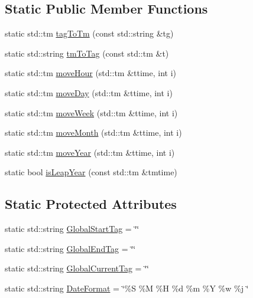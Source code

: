 \subsection*{\-Static \-Public \-Member \-Functions}
\begin{DoxyCompactItemize}
\item 
static std\-::tm \hyperlink{classcryomesh_1_1state_1_1PatternTagByDate_a783b2953283a8478f6919fd304cb69f1}{tag\-To\-Tm} (const std\-::string \&tg)
\item 
static std\-::string \hyperlink{classcryomesh_1_1state_1_1PatternTagByDate_a8c7d0a7aa8bf92aa05c2ea8ae2c60700}{tm\-To\-Tag} (const std\-::tm \&t)
\item 
static std\-::tm \hyperlink{classcryomesh_1_1state_1_1PatternTagByDate_ae0e700b6ce6d8b84e97e8b3e551fde57}{move\-Hour} (std\-::tm \&ttime, int i)
\item 
static std\-::tm \hyperlink{classcryomesh_1_1state_1_1PatternTagByDate_a9911819de318f1d49f04c67110dd95cd}{move\-Day} (std\-::tm \&ttime, int i)
\item 
static std\-::tm \hyperlink{classcryomesh_1_1state_1_1PatternTagByDate_a589ad778ee7350673d25c553bda0eb83}{move\-Week} (std\-::tm \&ttime, int i)
\item 
static std\-::tm \hyperlink{classcryomesh_1_1state_1_1PatternTagByDate_a04a41144a760e5a85c0aa4d7b05fdb30}{move\-Month} (std\-::tm \&ttime, int i)
\item 
static std\-::tm \hyperlink{classcryomesh_1_1state_1_1PatternTagByDate_ab47ab805764e76faff1791594fa83770}{move\-Year} (std\-::tm \&ttime, int i)
\item 
static bool \hyperlink{classcryomesh_1_1state_1_1PatternTagByDate_a20516b67d8c03a508c0b30395fd2784a}{is\-Leap\-Year} (const std\-::tm \&tmtime)
\end{DoxyCompactItemize}
\subsection*{\-Static \-Protected \-Attributes}
\begin{DoxyCompactItemize}
\item 
static std\-::string \hyperlink{classcryomesh_1_1state_1_1PatternTagByDate_add7aad1fe2fa9ba68a1f6efba392164b}{\-Global\-Start\-Tag} = \char`\"{}\char`\"{}
\item 
static std\-::string \hyperlink{classcryomesh_1_1state_1_1PatternTagByDate_a3e16a76aea6ea2d84e8f90fb9a861a3d}{\-Global\-End\-Tag} = \char`\"{}\char`\"{}
\item 
static std\-::string \hyperlink{classcryomesh_1_1state_1_1PatternTagByDate_a9fd6ba74e86f3f438e9853bd342a0842}{\-Global\-Current\-Tag} = \char`\"{}\char`\"{}
\item 
static std\-::string \hyperlink{classcryomesh_1_1state_1_1PatternTagByDate_aa377c0641330487a3249f710b92ae7b1}{\-Date\-Format} = \char`\"{}\%\-S \%\-M \%\-H \%d \%m \%\-Y \%w \%j \char`\"{}
\end{DoxyCompactItemize}
